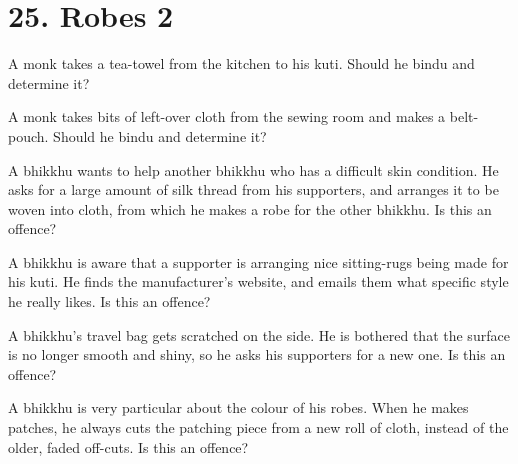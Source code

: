 \chapter{25. Robes 2}
\renewcommand*{\theChapterTitle}{25. Robes 2}

A monk takes a tea-towel from the kitchen to his kuti. Should he bindu and
determine it?

\bigskip

A monk takes bits of left-over cloth from the sewing room and makes a
belt-pouch. Should he bindu and determine it?

\bigskip

A bhikkhu wants to help another bhikkhu who has a difficult skin condition. He
asks for a large amount of silk thread from his supporters, and arranges it to
be woven into cloth, from which he makes a robe for the other bhikkhu. Is this
an offence?

\bigskip

A bhikkhu is aware that a supporter is arranging nice sitting-rugs being made for
his kuti. He finds the manufacturer's website, and emails them what specific
style he really likes. Is this an offence?

\bigskip

A bhikkhu's travel bag gets scratched on the side. He is bothered that the
surface is no longer smooth and shiny, so he asks his supporters for a new one.
Is this an offence?

\bigskip

A bhikkhu is very particular about the colour of his robes. When he makes
patches, he always cuts the patching piece from a new roll of cloth, instead of
the older, faded off-cuts. Is this an offence?


